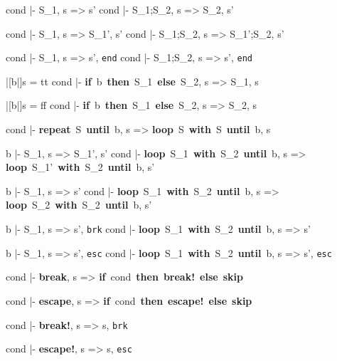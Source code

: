 \documentclass[12pt]{minimal}
\begin{document}
\vspace{5mm}

\vspace{5mm}

\vspace{5mm}
\inference
{cond |- S_1, s => s'}
{cond |- S_1;S_2, s => S_2, s'}

\vspace{5mm}
\inference
{cond |- S_1, s => S_1', s'}
{cond |- S_1;S_2, s => S_1';S_2, s'}

\vspace{5mm}
\inference
{cond |- S_1, s => s', \texttt{end}}
{cond |- S_1;S_2, s => s', \texttt{end}}

\vspace{5mm}
\inference
{|[b|]s = tt}
{cond |- \textbf{if}~b~\textbf{then}~S_1~\textbf{else}~S_2, s => S_1, s}

\vspace{5mm}
\inference
{|[b|]s = ff}
{cond |- \textbf{if}~b~\textbf{then}~S_1~\textbf{else}~S_2, s => S_2, s}

\vspace{5mm}
\inference
{}
{cond |- \textbf{repeat}~S~\textbf{until}~b, s => \textbf{loop}~S~\textbf{with}~S~\textbf{until}~b, s}

\vspace{5mm}
\inference
{b |- S_1, s => S_1', s'}
{cond |- \textbf{loop}~S_1~\textbf{with}~S_2~\textbf{until}~b, s => \textbf{loop}~S_1'~\textbf{with}~S_2~\textbf{until}~b, s'}

\vspace{5mm}
\inference
{b |- S_1, s => s'}
{cond |- \textbf{loop}~S_1~\textbf{with}~S_2~\textbf{until}~b, s => \textbf{loop}~S_2~\textbf{with}~S_2~\textbf{until}~b, s'}

\vspace{5mm}
\inference
{b |- S_1, s => s', \texttt{brk}}
{cond |- \textbf{loop}~S_1~\textbf{with}~S_2~\textbf{until}~b, s => s'}

\vspace{5mm}
\inference
{b |- S_1, s => s', \texttt{esc}}
{cond |- \textbf{loop}~S_1~\textbf{with}~S_2~\textbf{until}~b, s => s', \texttt{esc}}

\vspace{5mm}
\inference
{}
{cond |- \textbf{break}, s => \textbf{if}~cond~\textbf{then}~\textbf{break!}~\textbf{else}~\textbf{skip}}

\vspace{5mm}
\inference
{}
{cond |- \textbf{escape}, s => \textbf{if}~cond~\textbf{then}~\textbf{escape!}~\textbf{else}~\textbf{skip}}

\vspace{5mm}
\inference
{}
{cond |- \textbf{break!}, s => s, \texttt{brk}}

\vspace{5mm}
\inference
{}
{cond |- \textbf{escape!}, s => s, \texttt{esc}}
\end{document}

